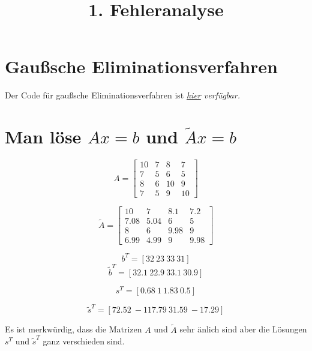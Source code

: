 \documentclass{article}
\title{1. Fehleranalyse}
\begin{document}
\maketitle

\section{Gaußsche Eliminationsverfahren}
Der Code für gaußsche Eliminationsverfahren ist \it{\href{https://github.com/MGreek/calcul-numeric/releases/tag/GaussianElimination}{hier}} verfügbar.

\section{Man löse $Ax=b$ und $\tilde{A}x=b$}

$$A=\begin{bmatrix}
10 & 7 & 8 & 7 \\
7 & 5 & 6 & 5 \\
8 & 6 & 10 & 9 \\
7 & 5 & 9 & 10
\end{bmatrix}$$


$$\tilde{A}=\begin{bmatrix}
10 & 7 & 8.1 & 7.2 \\
7.08 & 5.04 & 6 & 5 \\
8 & 6 & 9.98 & 9 \\
6.99 & 4.99 & 9 & 9.98
\end{bmatrix}$$

$$b^T=[32 \ 23 \ 33 \ 31]$$
$$\tilde{b}^T=[32.1 \ 22.9 \ 33.1 \ 30.9]$$

$$s^T=[0.68 \ 1 \ 1.83 \ 0.5]$$

$$\tilde{s}^T=[72.52 \ -117.79 \ 31.59 \ -17.29]$$

Es ist merkwürdig, dass die Matrizen $A$ und $\tilde{A}$ sehr änlich sind aber die Lösungen $s^T$ und $\tilde{s}^T$ ganz verschieden sind.
\end{document}
